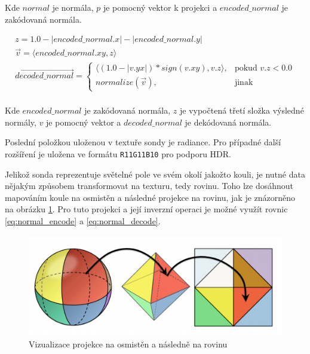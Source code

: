 Kde $normal$ je normála, $p$ je pomocný vektor k projekci a $encoded\_normal$ je zakódovaná normála.

\begin{equation} \label{eq:normal_decode}
	\begin{gathered}
	    z = 1.0 - |encoded\_normal.x| - |encoded\_normal.y|\\
	    \vec{v} = \langle encoded\_normal.xy, z \rangle\\
		\vec{decoded\_normal} = \begin{cases}
            \langle (1.0 - |v.yx|) * sign(v.xy), v.z \rangle,& \text{pokud } v.z < 0.0\\
            normalize(\vec{v}),              & \text{jinak}
        \end{cases}\\
	\end{gathered}
\end{equation}

Kde $encoded\_normal$ je zakódovaná normála, $z$ je vypočtená třetí složka výsledné normály, $v$ je pomocný vektor a $decoded\_normal$ je dekódovaná normála.

Poslední položkou uloženou v textuře sondy je radiance. Pro případné další rozšíření je uložena ve formátu \texttt{R11G11B10} pro podporu HDR.

Jelikož sonda reprezentuje světelné pole ve svém okolí jakožto kouli, je nutné data nějakým způsobem transformovat na texturu, tedy rovinu. Toho lze dosáhnout mapováním koule na osmistěn a následné projekce na rovinu, jak je znázorněno na obrázku \ref{fig:octahedral_wrap}. Pro tuto projekci a její inverzní operaci je možné využít rovnic \ref{eq:normal_encode} a \ref{eq:normal_decode}.

\begin{figure}[H]
	\centering
	\includegraphics[scale=2]{images/octahedral_wrap.png}
	\caption{Vizualizace projekce na osmistěn a následně na rovinu}
	\label{fig:octahedral_wrap}
\end{figure}

